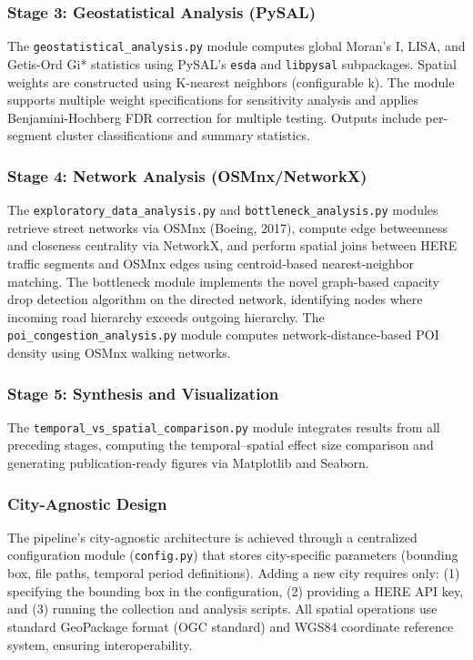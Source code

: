 \documentclass[12pt,a4paper]{article}
\begin{document}
\subsubsection{Stage 3: Geostatistical Analysis (PySAL)}

The \texttt{geostatistical\_analysis.py} module computes global Moran's I, LISA, and Getis-Ord Gi* statistics using PySAL's \texttt{esda} and \texttt{libpysal} subpackages. Spatial weights are constructed using K-nearest neighbors (configurable k). The module supports multiple weight specifications for sensitivity analysis and applies Benjamini-Hochberg FDR correction for multiple testing. Outputs include per-segment cluster classifications and summary statistics.

\subsubsection{Stage 4: Network Analysis (OSMnx/NetworkX)}

The \texttt{exploratory\_data\_analysis.py} and \texttt{bottleneck\_analysis.py} modules retrieve street networks via OSMnx (Boeing, 2017), compute edge betweenness and closeness centrality via NetworkX, and perform spatial joins between HERE traffic segments and OSMnx edges using centroid-based nearest-neighbor matching. The bottleneck module implements the novel graph-based capacity drop detection algorithm on the directed network, identifying nodes where incoming road hierarchy exceeds outgoing hierarchy. The \texttt{poi\_congestion\_analysis.py} module computes network-distance-based POI density using OSMnx walking networks.

\subsubsection{Stage 5: Synthesis and Visualization}

The \texttt{temporal\_vs\_spatial\_comparison.py} module integrates results from all preceding stages, computing the temporal--spatial effect size comparison and generating publication-ready figures via Matplotlib and Seaborn.

\subsubsection{City-Agnostic Design}

The pipeline's city-agnostic architecture is achieved through a centralized configuration module (\texttt{config.py}) that stores city-specific parameters (bounding box, file paths, temporal period definitions). Adding a new city requires only: (1) specifying the bounding box in the configuration, (2) providing a HERE API key, and (3) running the collection and analysis scripts. All spatial operations use standard GeoPackage format (OGC standard) and WGS84 coordinate reference system, ensuring interoperability.
\end{document}
